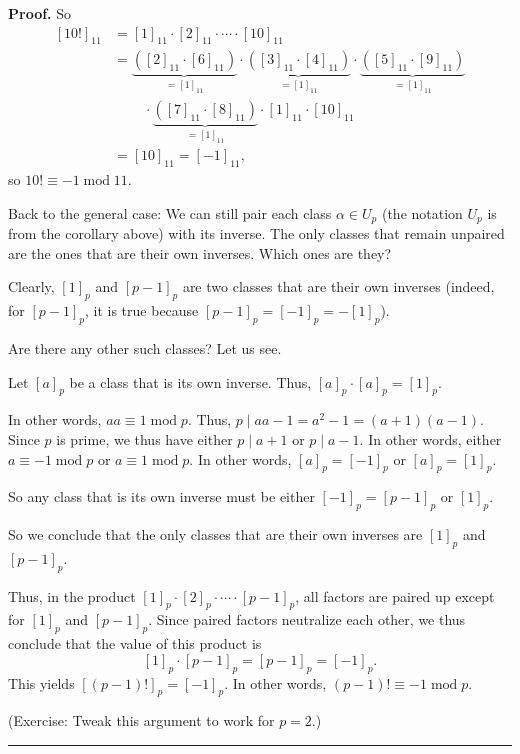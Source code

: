 \documentclass[numbers=enddot,12pt,final,onecolumn,notitlepage]{scrartcl}%
\numberwithin{exer}{subsection}
\theoremstyle{definition}
\newenvironment{proof}[1][Proof]{\noindent\textbf{#1.} }{\ \rule{0.5em}{0.5em}}
\begin{document}
\begin{proof}
So%
\begin{align*}
\left[  10!\right]  _{11}  &  =\left[  1\right]  _{11}\cdot\left[  2\right]
_{11}\cdot\cdots\cdot\left[  10\right]  _{11}\\
&  =\underbrace{\left(  \left[  2\right]  _{11}\cdot\left[  6\right]
_{11}\right)  }_{=\left[  1\right]  _{11}}\cdot\underbrace{\left(  \left[
3\right]  _{11}\cdot\left[  4\right]  _{11}\right)  }_{=\left[  1\right]
_{11}}\cdot\underbrace{\left(  \left[  5\right]  _{11}\cdot\left[  9\right]
_{11}\right)  }_{=\left[  1\right]  _{11}}\\
&  \ \ \ \ \ \ \ \ \ \ \cdot\underbrace{\left(  \left[  7\right]  _{11}%
\cdot\left[  8\right]  _{11}\right)  }_{=\left[  1\right]  _{11}}\cdot\left[
1\right]  _{11}\cdot\left[  10\right]  _{11}\\
&  =\left[  10\right]  _{11}=\left[  -1\right]  _{11},
\end{align*}
so $10!\equiv-1\operatorname{mod}11$.

Back to the general case: We can still pair each class $\alpha\in U_{p}$ (the
notation $U_{p}$ is from the corollary above) with its inverse. The only
classes that remain unpaired are the ones that are their own inverses. Which
ones are they?

Clearly, $\left[  1\right]  _{p}$ and $\left[  p-1\right]  _{p}$ are two
classes that are their own inverses (indeed, for $\left[  p-1\right]  _{p}$,
it is true because $\left[  p-1\right]  _{p}=\left[  -1\right]  _{p}=-\left[
1\right]  _{p}$).

Are there any other such classes? Let us see.

Let $\left[  a\right]  _{p}$ be a class that is its own inverse. Thus,
$\left[  a\right]  _{p}\cdot\left[  a\right]  _{p}=\left[  1\right]  _{p}$.

In other words, $aa\equiv1\operatorname{mod}p$. Thus, $p\mid aa-1=a^{2}%
-1=\left(  a+1\right)  \left(  a-1\right)  $. Since $p$ is prime, we thus have
either $p\mid a+1$ or $p\mid a-1$. In other words, either $a\equiv
-1\operatorname{mod}p$ or $a\equiv1\operatorname{mod}p$. In other words,
$\left[  a\right]  _{p}=\left[  -1\right]  _{p}$ or $\left[  a\right]
_{p}=\left[  1\right]  _{p}$.

So any class that is its own inverse must be either $\left[  -1\right]
_{p}=\left[  p-1\right]  _{p}$ or $\left[  1\right]  _{p}$.

So we conclude that the only classes that are their own inverses are $\left[
1\right]  _{p}$ and $\left[  p-1\right]  _{p}$.

Thus, in the product $\left[  1\right]  _{p}\cdot\left[  2\right]  _{p}%
\cdot\cdots\cdot\left[  p-1\right]  _{p}$, all factors are paired up except
for $\left[  1\right]  _{p}$ and $\left[  p-1\right]  _{p}$. Since paired
factors neutralize each other, we thus conclude that the value of this product
is%
\[
\left[  1\right]  _{p}\cdot\left[  p-1\right]  _{p}=\left[  p-1\right]
_{p}=\left[  -1\right]  _{p}.
\]
This yields $\left[  \left(  p-1\right)  !\right]  _{p}=\left[  -1\right]
_{p}$. In other words, $\left(  p-1\right)  !\equiv-1\operatorname{mod}p$.

(Exercise: Tweak this argument to work for $p=2$.)
\end{proof}
\end{document}
